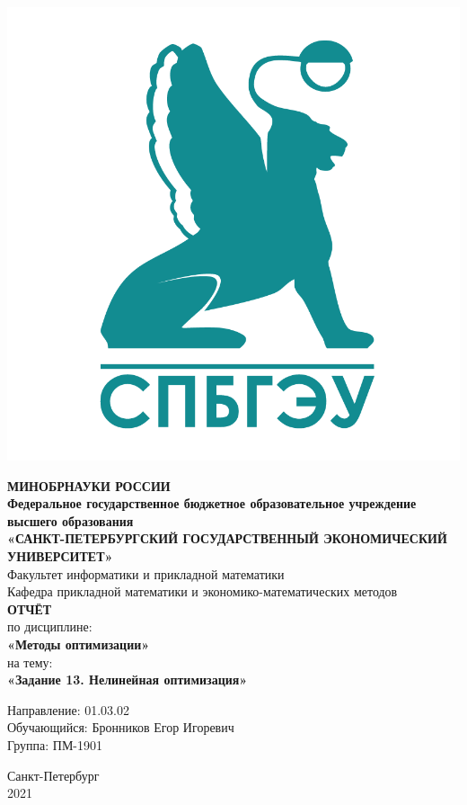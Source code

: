 \documentclass[14pt,a4paper,fleqn]{extarticle}
\begin{document}
	\begin{titlepage}
		\includegraphics[scale=0.12]{logo}
		\begin{center}
			\textbf{МИНОБРНАУКИ РОССИИ}\\
			\vspace{0.2cm}
			\textbf{Федеральное государственное бюджетное образовательное учреждение высшего образования}\\
			\textbf{«САНКТ-ПЕТЕРБУРГСКИЙ ГОСУДАРСТВЕННЫЙ ЭКОНОМИЧЕСКИЙ УНИВЕРСИТЕТ»}\\
			\vspace{0.6cm}
			Факультет информатики и прикладной математики\\
			Кафедра прикладной математики и экономико-математических методов\\
			\vspace{1cm}
			\textbf{ОТЧЁТ}\\
			по дисциплине:\\
			\textbf{«Методы оптимизации»}\\
			на тему:\\
			\textbf{«Задание 13. Нелинейная оптимизация»}\\
		\end{center}
		\vspace{1cm}
		Направление: 01.03.02\\
		Обучающийся: Бронников Егор Игоревич\\
		Группа: ПМ-1901\\
		\vfill
		\begin{center}
			Санкт-Петербург\\
			2021\\
		\end{center}
	\end{titlepage}
\end{document}
